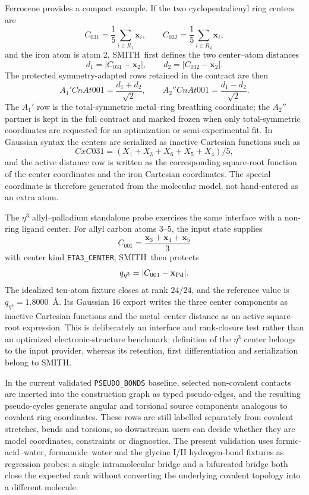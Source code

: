 \documentclass[journal=jctcce,manuscript=article,layout=traditional]{achemso}
\newcommand{\SMITH}{\textsc{SMITH}}
\theoremstyle{definition}
\begin{document}
Ferrocene provides a compact example.  If the two cyclopentadienyl ring
centers are
\[
 C_{031}=\frac{1}{5}\sum_{i\in R_1}\mathbf{x}_i,\qquad
 C_{032}=\frac{1}{5}\sum_{i\in R_2}\mathbf{x}_i,
\]
and the iron atom is atom 2, \SMITH\ first defines the two center--atom
distances
\[
 d_1=|C_{031}-\mathbf{x}_2|,\qquad d_2=|C_{032}-\mathbf{x}_2|.
\]
The protected symmetry-adapted rows retained in the contract are then
\[
 A_1'CnAt001=\frac{d_1+d_2}{\sqrt2},\qquad
 A_2''CnAt001=\frac{d_1-d_2}{\sqrt2}.
\]
The \(A_1'\) row is the total-symmetric metal--ring breathing coordinate; the
\(A_2''\) partner is kept in the full contract and marked frozen when only
total-symmetric coordinates are requested for an optimization or
semi-experimental fit.  In Gaussian syntax the centers are serialized as
inactive Cartesian functions such as
\[
 CxC031=(X_1+X_3+X_6+X_5+X_4)/5,
\]
and the active distance row is written as the corresponding square-root
function of the center coordinates and the iron Cartesian coordinates.  The
special coordinate is therefore generated from the molecular model, not
hand-entered as an extra atom.

The $\eta^3$ allyl--palladium standalone probe exercises the same interface with a
non-ring ligand center.  For allyl carbon atoms 3--5, the input state supplies
\[
 C_{001}=\frac{\mathbf{x}_3+\mathbf{x}_4+\mathbf{x}_5}{3}
\]
with center kind \texttt{ETA3\_CENTER}; \SMITH\ then protects
\[
 q_{\eta^3}=|C_{001}-\mathbf{x}_{\rm Pd}|.
\]
The idealized ten-atom fixture closes at rank \(24/24\), and the reference
value is \(q_{\eta^3}=1.8000\)~\AA.  Its Gaussian 16 export writes the three
center components as inactive Cartesian functions and the metal--center
distance as an active square-root expression.  This is deliberately an
interface and rank-closure test rather than an optimized electronic-structure
benchmark: definition of the $\eta^3$ center belongs to the input provider,
whereas its retention, first differentiation and serialization belong to \SMITH.

In the current validated \texttt{PSEUDO\_BONDS} baseline, selected
non-covalent contacts are inserted into the construction graph as typed
pseudo-edges, and the resulting pseudo-cycles generate angular and torsional
source components analogous to covalent ring coordinates.  These rows are still
labelled separately from covalent stretches, bends and torsions, so downstream
users can decide whether they are model coordinates, constraints or
diagnostics.  The present validation uses formic-acid--water, formamide--water
and the glycine I/II hydrogen-bond fixtures as regression probes: a single
intramolecular bridge and a bifurcated bridge both close the expected rank
without converting the underlying covalent topology into a different molecule.
\end{document}
